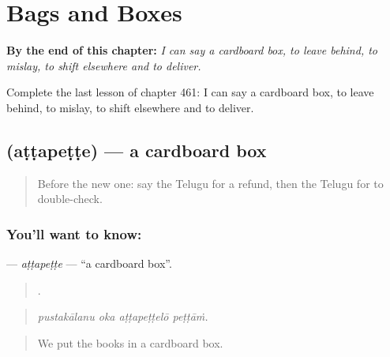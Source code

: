 
\chapter{Bags and Boxes}
\label{ch:te-bags-and-boxes}

\begin{chapteropening}
\textbf{By the end of this chapter:} \emph{I can say a cardboard box, to leave behind, to mislay, to shift elsewhere and to deliver.}

Complete the last lesson of chapter 461: I can say a cardboard box, to leave behind, to mislay, to shift elsewhere and to deliver.
\end{chapteropening}

\section[\texorpdfstring{\te{అట్టపెట్టె} (aṭṭapeṭṭe)}{అట్టపెట్టె (aṭṭapeṭṭe)}]{ (aṭṭapeṭṭe) — a cardboard box}

\label{lesson:TE-C461-attapette}



\begin{quote}
Before the new one: say the Telugu for a refund, then the Telugu for to double-check.
\end{quote}

\subsection*{You'll want to know: }
\textbf{} — \emph{aṭṭapeṭṭe} — \textquotedblleft{}a cardboard box\textquotedblright{}.

\begin{quote}
   .
\end{quote}

\begin{quote}
\emph{pustakālanu oka aṭṭapeṭṭelō peṭṭāṁ.}
\end{quote}

\begin{quote}
We put the books in a cardboard box.
\end{quote}


